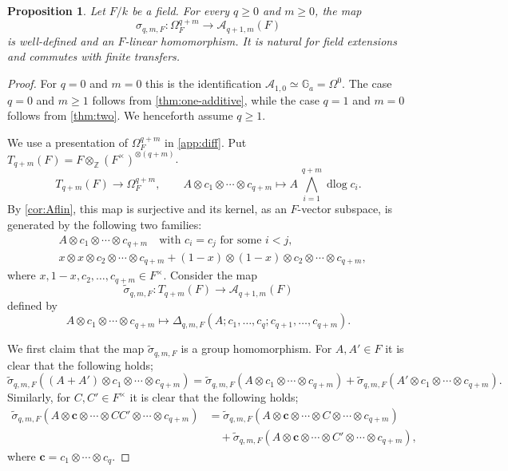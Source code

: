 \documentclass[a4paper,12pt,reqno]{amsart}
\numberwithin{equation}{section}
\newtheorem{prop}[prop]{Proposition}
\theoremstyle{definition}
\newcommand{\Z}{\mathbb{Z}}
\DeclareMathOperator{\dlog}{dlog}
\newcommand{\Ga}{\mathbb{G}_{a}}
\newcommand{\Acal}{\mathcal{A}}
\newcommand{\vc}{\mathbf{c}}
\begin{document}
\begin{prop}\label{prop:top}
Let $F/k$ be a field. For every $q\geq0$ and $m\geq 0$, the map 
\begin{equation}\label{eq:taumap}
 \sigma_{q,m,F}:\Omega_F^{q+m}\to\Acal_{q+1,m}(F)
\end{equation}
is well-defined and 
an $F$-linear homomorphism. 
It is natural for field extensions and commutes with finite transfers.
\end{prop}
\begin{proof}
For $q=0$ and $m=0$ this is the
identification $\Acal_{1,0}\simeq\Ga=\Omega^0$.
The case $q=0$ and $m\geq 1$ follows from
\autoref{thm:one-additive}, while the case $q=1$ and $m=0$ follows from \autoref{thm:two}.
We henceforth assume $q\ge 1$.

    We use a presentation of $\Omega^{q+m}_F$ in \autoref{app:diff}. 
Put $T_{q+m}(F)=F\otimes_\Z (F^\times)^{\otimes (q+m)}$. 
    \begin{equation}\label{eq:BKmap}
 T_{q+m}(F) \to\Omega_F^{q+m},
 \qquad
 A\otimes c_1\otimes\cdots\otimes c_{q+m}
 \mapsto
 A\,\bigwedge_{i=1}^{q+m}\dlog c_i.
\end{equation}
By \autoref{cor:Aflin}, 
this map is surjective and its
kernel, as an $F$-vector subspace, is generated by the following two
families:
\begin{align}
&A\otimes c_1\otimes\cdots\otimes c_{q+m}
 \quad\text{with }c_i=c_j\text{ for some }i<j,
 \label{eq:A1}\\
&x\otimes x\otimes c_2\otimes\cdots\otimes c_{q+m}
 +(1-x)\otimes(1-x)\otimes c_2\otimes\cdots\otimes c_{q+m},
 \label{eq:A2}
\end{align}
where $x,1-x,c_2,\ldots,c_{q+m}\in F^\times$.
    Consider the map
    \[
    \widetilde \sigma_{q,m,F}: T_{q+m}(F) \to \Acal_{q+1,m}(F)
    \]
    defined by 
    \[
	 A\otimes c_1\otimes\cdots\otimes c_{q+m}
     \mapsto \Delta_{q,m,F}(A;c_1,\ldots,c_q;c_{q+1},\dots,c_{q+m}).
    \]
    
    We first claim that the map $\widetilde \sigma_{q,m,F}$ is a group homomorphism. 
    For $A, A'\in F$ it is clear that the following holds;
    \[
    \widetilde \sigma_{q,m,F}((A+A')\otimes c_1\otimes \cdots \otimes c_{q+m})
    =\widetilde \sigma_{q,m,F}(A\otimes c_1\otimes \cdots \otimes c_{q+m})+\widetilde \sigma_{q,m,F}(A'\otimes c_1\otimes \cdots \otimes c_{q+m}).
    \]
    Similarly, for $C,C'\in F^\times$ it is clear that the following holds;
    \begin{align}
        \widetilde \sigma_{q,m,F}(A\otimes \vc\otimes \cdots \otimes CC'\otimes \cdots \otimes c_{q+m})
        &=\widetilde \sigma_{q,m,F}(A\otimes \vc\otimes \cdots \otimes C\otimes \cdots \otimes c_{q+m})\\
        &\quad +\widetilde \sigma_{q,m,F}(A\otimes \vc\otimes \cdots \otimes C'\otimes \cdots\otimes  c_{q+m}),
    \end{align}
    where $\boldsymbol{c}=c_1\otimes \cdots \otimes c_q$.
    

\end{proof}
\end{document}
